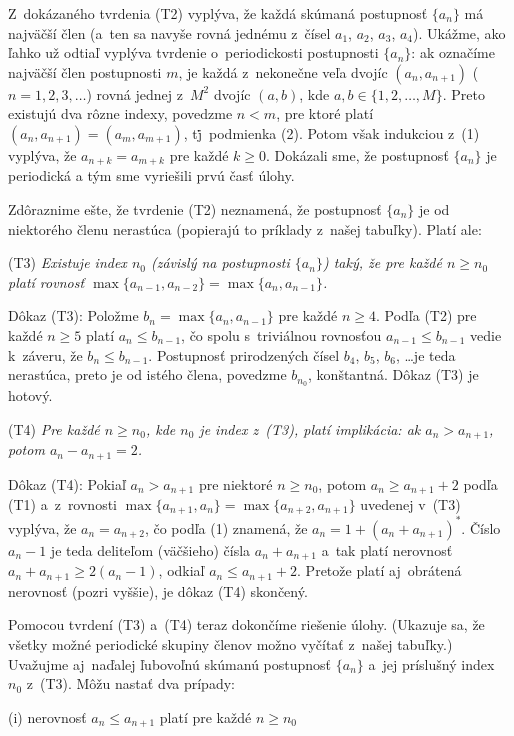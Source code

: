 {Z~dokázaného tvrdenia (T2) vyplýva, že každá skúmaná postupnosť
$\{a_n\}$ má najväčší člen (a~ten sa navyše rovná jednému z~čísel
$a_1$, $a_2$, $a_3$, $a_4$). Ukážme, ako ľahko už odtiaľ vyplýva
tvrdenie o~periodickosti postupnosti $\{a_n\}$: ak označíme
najväčší člen postupnosti $m$, je každá z~nekonečne veľa dvojíc $(a_n,a_{n+1})$
($n=1,2,3,\dots$) rovná jednej z~$M^2$ dvojíc $(a,b)$, kde
$a,b\in\{1,2,\dots,M\}$. Preto existujú dva rôzne indexy, povedzme
$n<m$, pre ktoré platí $(a_n,a_{n+1})=(a_m,a_{m+1})$,
t\.j\.~podmienka (2). Potom však indukciou z~(1) vyplýva, že
$a_{n+k}=a_{m+k}$ pre každé $k\geq0$. Dokázali sme, že postupnosť
$\{a_n\}$ je periodická a tým sme vyriešili prvú časť úlohy.

\smallskip
Zdôraznime ešte, že tvrdenie (T2) neznamená,
že postupnosť $\{a_n\}$ je od niektorého členu nerastúca
(popierajú to príklady z~našej tabuľky). Platí ale:

\smallskip
(T3) {\sl Existuje index $n_0$ (závislý na postupnosti $\{a_n\}$)
taký, že pre každé $n\geq n_0$ platí rovnosť
$\max\{a_{n-1},a_{n-2}\}=\max\{a_n,a_{n-1}\}$.}

\smallskip
Dôkaz (T3): Položme $b_n=\max\{a_n,a_{n-1}\}$ pre každé $n\geq4$.
Podľa (T2) pre každé $n\geq5$ platí  $a_n\leq b_{n-1}$, čo spolu
s~triviálnou rovnosťou $a_{n-1}\leq b_{n-1}$ vedie k~záveru, že
$b_n\leq b_{n-1}$. Postupnosť prirodzených čísel $b_4$, $b_5$, $b_6$,
\dots je teda nerastúca, preto je od istého člena, povedzme
$b_{n_0}$, konštantná. Dôkaz (T3) je hotový.

\smallskip
(T4) {\sl Pre každé $n\geq n_0$, kde $n_0$ je index z~{\rm (T3)},
platí implikácia: ak $a_{n}>a_{n+1}$, potom  $a_n-a_{n+1}=2$.}

\smallskip
Dôkaz (T4): Pokiaľ $a_{n}>a_{n+1}$ pre niektoré $n\geq n_0$, potom
$a_{n}\geq a_{n+1}+2$ podľa (T1)
a~z~rovnosti $\max\{a_{n+1},a_n\}=\max\{a_{n+2},a_{n+1}\}$ uvedenej
v~(T3) vyplýva, že $a_{n}=a_{n+2}$, čo podľa (1) znamená, že
$a_n=1+(a_n+a_{n+1})^{*}$. Číslo $a_n-1$ je teda deliteľom
(väčšieho) čísla $a_n+a_{n+1}$ a~tak platí nerovnosť
$a_n+a_{n+1}\geq2(a_n-1)$, odkiaľ $a_{n}\leq a_{n+1}+2$. Pretože
platí aj~obrátená nerovnosť (pozri vyššie), je dôkaz (T4)
skončený.

Pomocou tvrdení (T3) a~(T4) teraz dokončíme riešenie úlohy. (Ukazuje
sa, že všetky možné periodické skupiny členov možno vyčítať z~našej tabuľky.)
Uvažujme aj~naďalej ľubovoľnú skúmanú postupnosť  $\{a_n\}$
a~jej príslušný index $n_0$ z~(T3). Môžu nastať dva prípady:

\smallskip
(i) nerovnosť $a_n\leq a_{n+1}$ platí pre každé $n\geq n_0$

}
